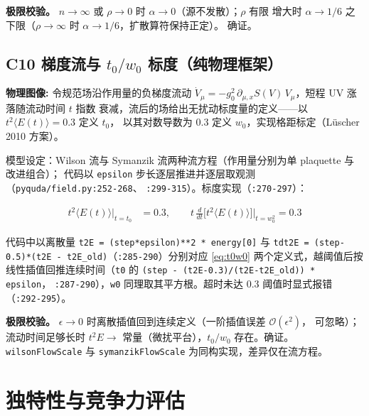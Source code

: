 \documentclass[UTF8]{ctexart}
\begin{document}
\textbf{极限校验。} $n\to\infty$ 或 $\rho\to 0$ 时 $\alpha\to 0$（源不发散）；$\rho$ 有限
增大时 $\alpha\to 1/6$ 之下限（$\rho\to\infty$ 时 $\alpha \to 1/6$，扩散算符保持正定）。
\textcolor{accent}{确证}。

\subsection{C10 梯度流与 $t_0/w_0$ 标度（纯物理框架）}

\begin{physbox}
\textbf{物理图像:} 令规范场沿作用量的负梯度流动
$\dot{V}_\mu = -g_0^2\,\partial_{\mu,x} S(V)\,V_\mu$，短程 UV 涨落随流动时间 $t$ 指数
衰减，流后的场给出无扰动标度量的定义——以 $t^2\langle E(t)\rangle = 0.3$ 定义 $t_0$，
以其对数导数为 0.3 定义 $w_0$，实现格距标定（L\"uscher 2010 方案）。
\end{physbox}

模型设定：Wilson 流与 Symanzik 流两种流方程（作用量分别为单 plaquette 与改进组合）；
代码以 \texttt{epsilon} 步长逐层推进并逐层取观测（\texttt{pyquda/field.py:252-268}、
\texttt{:299-315}）。标度实现（\texttt{:270-297}）：

\begin{align}
t^2\langle E(t)\rangle\Big|_{t=t_0} &= 0.3, \qquad
t\,\frac{d}{dt}\big[t^2\langle E(t)\rangle\big]\Big|_{t=w_0^2} = 0.3 \label{eq:t0w0}
\end{align}

代码中以离散量 \texttt{t2E = (step*epsilon)**2 * energy[0]} 与
\texttt{tdt2E = (step-0.5)*(t2E - t2E\_old)}（\texttt{:285-290}）分别对应 \eqref{eq:t0w0}
两个定义式，越阈值后按线性插值回推连续时间（\texttt{t0} 的 \texttt{(step - (t2E-0.3)/(t2E-t2E\_old)) * epsilon}，
\texttt{:287-290}），\texttt{w0} 同理取其平方根。超时未达 0.3 阈值时显式报错
（\texttt{:292-295}）。

\textbf{极限校验。} $\epsilon \to 0$ 时离散插值回到连续定义（一阶插值误差 $\mathcal{O}(\epsilon^2)$，
可忽略）；流动时间足够长时 $t^2E \to $ 常量（微扰平台），$t_0/w_0$ 存在。\textcolor{accent}{确证}。
\texttt{wilsonFlowScale} 与 \texttt{symanzikFlowScale} 为同构实现，差异仅在流方程。

\section{独特性与竞争力评估}
\end{document}
